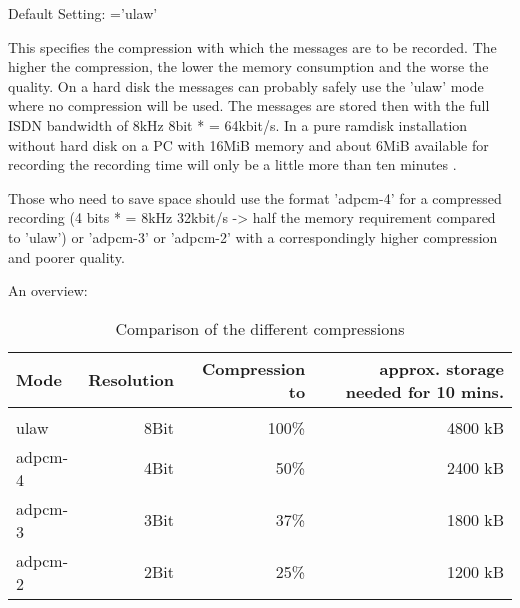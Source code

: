 \begin{description}


    Default Setting: ='ulaw'

    This specifies the compression with which the messages are to be recorded.
    The higher the compression, the lower the memory consumption and the worse the quality.
    On a hard disk the messages can probably safely use the 'ulaw' mode where no
    compression will be used. The messages are stored then with the full ISDN bandwidth
    of 8kHz 8bit * = 64kbit/s. In a pure ramdisk installation without hard disk on a PC
    with 16MiB memory and about 6MiB available for recording the recording time will
    only be a little more than ten minutes .

    Those who need to save space should use the format 'adpcm-4' for a compressed recording 
    (4 bits * = 8kHz 32kbit/s -> half the memory requirement compared to 'ulaw') or
    'adpcm-3' or 'adpcm-2' with a correspondingly higher compression and poorer quality.

    An overview:

    \begin{table}[htbp]
      \begin{tabular}{lrrr}
        Mode     & Resolution       & Compression to  & approx. storage needed for 10 mins.\\
        \hline \\
        ulaw     & 8Bit             & 100\%           & 4800 kB       \\
        adpcm-4  & 4Bit             &  50\%           & 2400 kB       \\
        adpcm-3  & 3Bit             &  37\%           & 1800 kB       \\
        adpcm-2  & 2Bit             &  25\%           & 1200 kB       \\
      \end{tabular}
      \caption{Comparison of the different compressions}
    \end{table}



\end{description}
